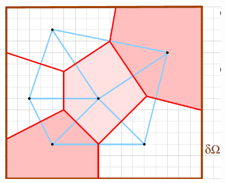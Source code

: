 \begin{figure}[H]
    \begin{minipage}{0.5\columnwidth}
        \includegraphics[width=\columnwidth]{images/semaine13_maillage5.png}
    \end{minipage}
\end{figure}
